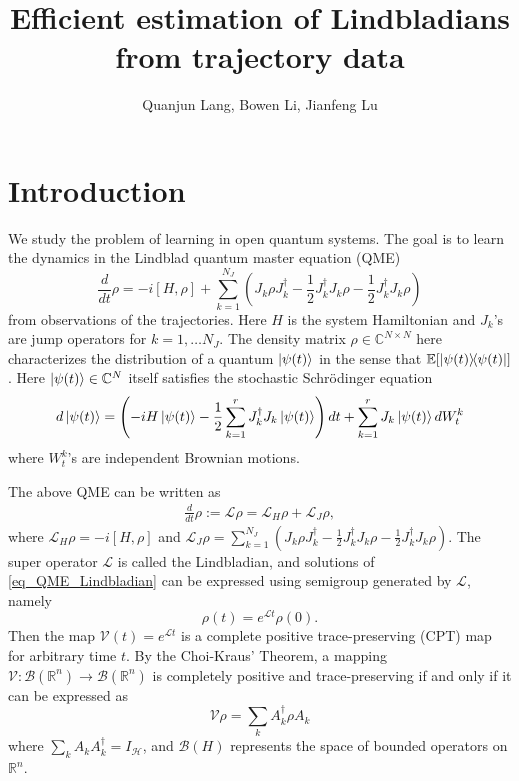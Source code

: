 \documentclass[10pt]{article}  %
\title{Efficient estimation of Lindbladians from trajectory data}
\author{Quanjun Lang, Bowen Li, Jianfeng Lu}
\date{}
\theoremstyle{plain}
\numberwithin{equation}{section}
\def\mH{\mathcal{H}}
\def\mL{\mathcal{L}}
\def\mV{\mathcal{V}}
\def\mB{\mathcal{B}}
\def\R{\mathbb{R}}
\def\C{\mathbb{C}}
\renewcommand{\R}{\mathbb{R}}
\renewcommand{\C}{\mathbb{C}}
\begin{document}
\maketitle

\tableofcontents
\section{Introduction}

We study the problem of learning in open quantum systems. The goal is to learn the dynamics in the Lindblad quantum master equation (QME)
\begin{equation}\label{eq_QME_main}
	\frac{d}{dt} \rho = -i[H, \rho] + \sum_{k = 1}^{N_J} (J_k \rho J_k^\dagger - \frac{1}{2} J_k^\dagger J_k \rho - \frac{1}{2} J_k^\dagger J_k \rho)
\end{equation}
from observations of the trajectories. Here $H$ is the system Hamiltonian and $J_k$'s are jump operators for $k = 1, \dots N_J$. The density matrix $\rho \in \C^{N \times N}$ here characterizes the distribution of a quantum $\ket{\psi(t)}$ in the sense that $\mathbb{E}[\ketbra{\psi(t)}{\psi(t)}]$. 
Here $\ket{\psi(t)} \in \C^N$ itself satisfies the stochastic Schr\"{o}dinger equation
\begin{equation}
	d \ket{\psi(t)} = \left( -i H \ket{\psi(t)} - \frac{1}{2}\sum_{k = 1}^r J_k^\dagger J_k \ket{\psi(t)}\right) dt + \sum_{k = 1}^r J_k \ket{\psi(t)} dW^k_t
\end{equation}
where $W^k_t$'s are independent Brownian motions.


The above QME can be written as
\begin{align}\label{eq_QME_Lindbladian}
	\frac{d}{dt} \rho := \mL \rho =  \mL_H\rho + \mL_J \rho, 
\end{align}
where $\mL_H \rho = -i[H, \rho]$ and $\mL_J \rho = \sum_{k = 1}^{N_J} (J_k \rho J_k^\dagger - \frac{1}{2} J_k^\dagger J_k \rho - \frac{1}{2} J_k^\dagger J_k \rho)$. The super operator $\mL$ is called the Lindbladian, and solutions of \eqref{eq_QME_Lindbladian} can be expressed using semigroup generated by $\mL$, namely
\begin{equation}
	\rho(t) = e^{\mL t}\rho(0).
\end{equation}
Then the map $\mV(t) = e^{\mL t}$ is a complete positive trace-preserving (CPT) map for arbitrary time $t$. By the Choi-Kraus' Theorem, a mapping $\mV:\mB(\R^n) \to \mB(\R^n)$ is completely positive and trace-preserving if and only if it can be expressed as 
\begin{equation}
	\mV\rho = \sum_{k}A_k^\dagger \rho A_k
\end{equation}
where $\sum_{k}A_kA_k^\dagger = I_\mH$, and $\mB(H)$ represents the space of bounded operators on $\R^n$. 
\end{document}
